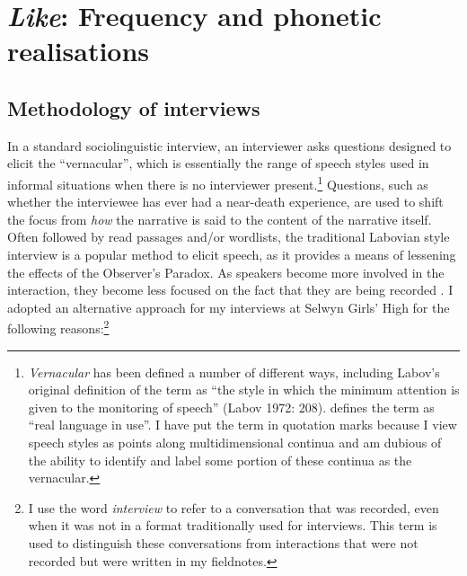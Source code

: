 \chapter{\textit{Like}: Frequency and phonetic realisations}
\label{ch:prod}
\date{}

\section{Methodology of interviews}\label{interview:method}

In a standard sociolinguistic interview, an interviewer asks questions designed to elicit the ``vernacular'', which is essentially the range of speech styles used in informal situations when there is no interviewer present.\footnote{\textit{Vernacular} has been defined a number of different ways, including Labov's original definition of the term as ``the style in which the minimum attention is given to the monitoring of speech'' (Labov 1972: 208).  \citet{milroy1992} defines the term as ``real language in use''. I have put the term in quotation marks because I view speech styles as points along multidimensional continua and am dubious of the ability to identify and label some portion of these continua as the vernacular.} Questions, such as whether the interviewee has ever had a near-death experience, are used to shift the focus from \textit{how} the narrative is said to the content of the narrative itself. Often followed by read passages and/or wordlists, the traditional Labovian style interview is a popular method to elicit speech, as it provides a means of lessening the effects of the Observer's Paradox. As speakers become more involved in the interaction, they become less focused on the fact that they are being recorded \citep{labov1972sociolingpatterns}. I adopted an alternative approach for my interviews at Selwyn Girls' High for the following reasons:\footnote{I use the word \textit{interview} to refer to a conversation that was recorded, even when it was not in a format traditionally used for interviews. This term is used to distinguish these conversations from interactions that were not recorded but were written in my fieldnotes.} 



